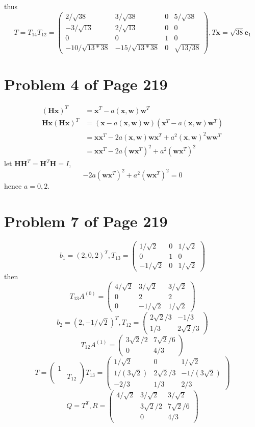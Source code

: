 \documentclass[12pt,a4paper]{article}
\newcommand{\mysection}[2]{
\section{Problem #1 of Page #2}	
	}
\begin{document}
thus
\[
	T = T_{14}T_{12} = \left(\begin{array}{cccc}  
	2/\sqrt{38} & 3/\sqrt{38} & 0 & 5/\sqrt{38} \\
	-3/\sqrt{13} & 2/\sqrt{13} & 0 & 0 \\
	0 & 0 &1 &0 \\
	-10/\sqrt{13*38} & -15/\sqrt{13*38} & 0 & \sqrt{13/38} 
	\end{array} \right) ,
	T\bm{x} = \sqrt{38}\bm{e}_1
\]
\mysection{4}{219}
\[ \begin{split} 
		(\bm{Hx})^T &= \bm{x}^T - a(\bm{x},\bm{w})\bm{w}^T \\
		\bm{Hx}(\bm{Hx})^T &= (\bm{x} - a(\bm{x},\bm{w})\bm{w})(\bm{x}^T - a(\bm{x},\bm{w})\bm{w}^T) \\
		&= \bm{xx}^T - 2a(\bm{x},\bm{w})\bm{wx}^T + a^2(\bm{x},\bm{w})^2 \bm{ww}^T \\
		&= \bm{xx}^T - 2a(\bm{wx}^T)^2 + a^2(\bm{wx}^T)^2
	\end{split}
\]
let $\bm{H}\bm{H}^T = \bm{H}^T\bm{H} = I$,
\[
	- 2a(\bm{wx}^T)^2 + a^2(\bm{wx}^T)^2 = 0	
\]
hence $a = 0 , 2$.

\mysection{7}{219}
\[
	b_1 = (2,0,2)^T, T_{13} = \left( \begin{array}{ccc}
	1/\sqrt{2} & 0 & 1/\sqrt{2} \\
	0 & 1  & 0\\
	-1/\sqrt{2} & 0 & 1/\sqrt{2}
	\end{array} \right) 
\]
then
\[
	T_{13}A^{(0)} = \left( \begin{array}{ccc}
	4/\sqrt{2} & 3/\sqrt{2} & 3/\sqrt{2} \\
	0 & 2 & 2 \\
	0 & -1/\sqrt{2} & 1/\sqrt{2} 
	\end{array}\right)
\]
\[
	b_2 = (2,-1/\sqrt{2})^T, T_{12} = \left(\begin{array}{cc}
	 2\sqrt{2}/3 & -1/3 \\
	 1/3 & 2\sqrt{2}/3
	\end{array} \right) 
\]
\[
	T_{12}A^{(1)} = \left( \begin{array}{cc}
	 3\sqrt{2}/2 & 7\sqrt{2}/6 \\
	 0 & 4/3
	\end{array} \right) 
\]
\[
	T= \left( \begin{array}{cc}
	1 & \\
	 & T_{12}
	\end{array} \right)T_{13}
	= \left(\begin{array}{ccc} 
	 1/\sqrt{2} & 0 & 1/\sqrt{2} \\
	 1/(3\sqrt{2}) & 2\sqrt{2}/3 & -1/(3\sqrt{2}) \\
	 -2/3 & 1/3 & 2/3	
	\end{array} \right) 
\]
\[
	Q = T^T,
	R = \left(\begin{array}{ccc} 
		4/\sqrt{2} & 3/\sqrt{2} & 3/\sqrt{2} \\
			& 3\sqrt{2}/2 & 7\sqrt{2}/6 \\
			& 0 & 4/3	
	\end{array} \right) 
\]
\end{document}
